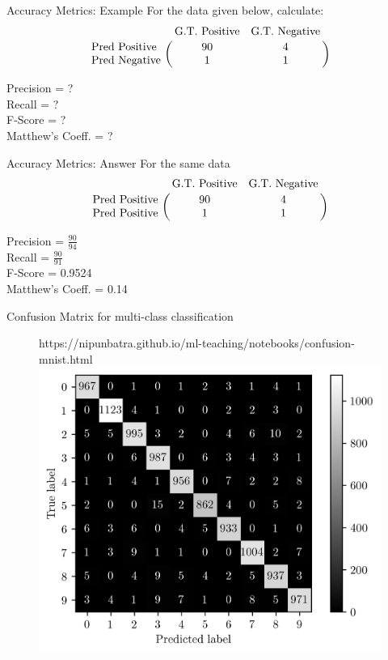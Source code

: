 \documentclass[usenames,dvipsnames]{beamer}
\begin{document}
\begin{frame}{Accuracy Metrics: Example}
For the data given below, calculate: 
$$
\bordermatrix{&\text{G.T. Positive}&\text{G.T. Negative}\cr
               \text{Pred Positive}&90&4\cr
               \text{Pred Negative}&1&1}
$$

Precision = ?  \\
Recall = ?\\
F-Score = ?\\
Matthew's Coeff. = ?\\
\end{frame}

\begin{frame}{Accuracy Metrics: Answer}
For the same data
$$
\bordermatrix{&\text{G.T. Positive}&\text{G.T. Negative}\cr
               \text{Pred Positive}&90&4\cr
               \text{Pred Positive}&1&1}
$$

Precision = $\frac{90}{94}$ \\
Recall = $\frac{90}{91}$ \\
F-Score = 0.9524 \\
Matthew's Coeff. = 0.14
\end{frame}


\begin{frame}{Confusion Matrix for multi-class classification}
	\begin{figure}[htp]
		\centering
		\begin{notebookbox}{https://nipunbatra.github.io/ml-teaching/notebooks/confusion-mnist.html}
		  \includegraphics[scale=0.5]{../assets/accuracy-convention/figures/mnist-cm.png}
		\end{notebookbox}
	  \end{figure}
	
\end{frame}
\end{document}
